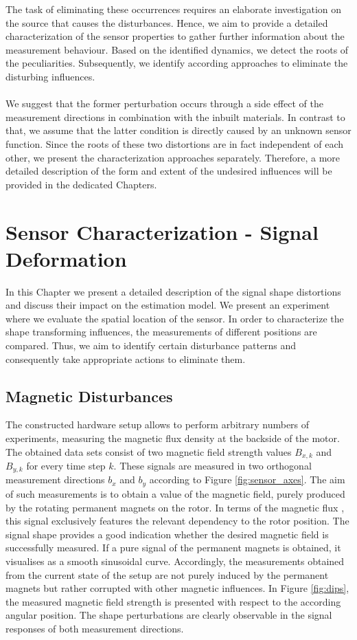 \documentclass[english]{isasthesis}
\begin{document}
     The task of eliminating these occurrences requires an elaborate investigation on the source that causes the disturbances. Hence, we aim to provide a detailed characterization of the sensor properties to gather further information about the measurement behaviour. Based on the identified dynamics, we detect the roots of the peculiarities. Subsequently, we identify according approaches to eliminate the disturbing influences. \\ \\
      We suggest that the former perturbation occurs through a side effect of the measurement directions in combination with the inbuilt materials. In contrast to that, we assume that the latter condition is directly caused by an unknown sensor function. Since the roots of these two distortions are in fact independent of each other, we present the characterization approaches separately. Therefore, a more detailed description of the form and extent of the undesired influences will be provided in the dedicated Chapters. 
     
    \chapter{Sensor Characterization - Signal Deformation}\label{sensor characterization}
    In this Chapter we present a detailed description of the signal shape distortions and discuss their impact on the estimation model. We present an experiment where we evaluate the spatial location of the sensor. In order to characterize the shape transforming influences, the measurements of different positions are compared. Thus, we aim to identify certain disturbance patterns and consequently take appropriate actions to eliminate them.          
    	\section{Magnetic Disturbances} \label{magnetic disturbances}
    	The constructed hardware setup allows to perform arbitrary numbers of experiments, measuring the magnetic flux density at the backside of the motor. The obtained data sets consist of two magnetic field strength values $B_{x,k}$ and $B_{y,k}$ for every time step $k$. These signals are measured in two orthogonal measurement directions $b_x$ and $b_y$ according to Figure \ref{fig:sensor_axes}. The aim of such measurements is to obtain a value of the magnetic field, purely produced by the rotating permanent magnets on the rotor. In terms of the magnetic flux , this signal exclusively features the relevant dependency to the rotor position. The signal shape provides a good indication whether the desired magnetic field is successfully measured. If a pure signal of the permanent magnets is obtained, it visualises as a smooth sinusoidal curve. Accordingly, the measurements obtained from the current state of the setup are not purely induced by the permanent magnets but rather corrupted with other magnetic influences. In Figure \ref{fig:dips}, the measured magnetic field strength is presented with respect to the according angular position. The shape perturbations are clearly observable in the signal responses of both measurement directions.\\ \\
\end{document}
